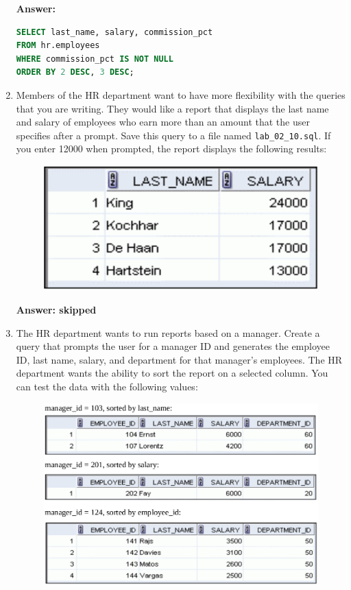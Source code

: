 \documentclass[a4paper,12pt]{article}
\begin{document}
\begin{enumerate}
    \textbf{Answer: }
    \begin{lstlisting}[language=SQL, label={lst:employees_data}]
SELECT last_name, salary, commission_pct
FROM hr.employees
WHERE commission_pct IS NOT NULL
ORDER BY 2 DESC, 3 DESC;
    \end{lstlisting}
    \newpage
    \item Members of the HR department want to have more flexibility with the queries that you are
writing. They would like a report that displays the last name and salary of employees who earn
more than an amount that the user specifies after a prompt. Save this query to a file named
\texttt{lab\_02\_10.sql}. If you enter 12000 when prompted, the report displays the following
results:
\begin{figure}[h]
    \centering
    \includegraphics*[width=0.35\linewidth]{graphics/210.png}
\end{figure}

\textbf{Answer: skipped}
    \item The HR department wants to run reports based on a manager. Create a query that prompts the
user for a manager ID and generates the employee ID, last name, salary, and department for
that manager's employees. The HR department wants the ability to sort the report on a selected
column. You can test the data with the following values:
\begin{figure}[h]
    \centering
    \includegraphics*[width=.6\linewidth]{graphics/211.png}
\end{figure}


\end{enumerate}
\end{document}
